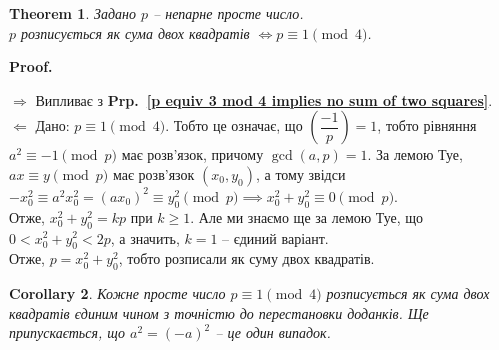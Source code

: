 \documentclass[a4paper, 10pt]{article}
\makeatletter
\theoremstyle{theoremdd}
\newtheorem{theorem}{Theorem}[subsection]
\theoremstyle{theoremdd}
\theoremstyle{theoremdd}
\theoremstyle{theoremdd}
\theoremstyle{theoremdd}
\theoremstyle{theoremdd}
\theoremstyle{theoremdd}
\theoremstyle{theoremdd}
\newtheorem{corollary}[theorem]{Corollary}
\def\rightproof{$\boxed{\Rightarrow}$ }
\def\leftproof{$\boxed{\Leftarrow}$ }
\renewenvironment{proof}[1][Proof.\\]{\par
\pushQED{\hfill \qed}%
\normalfont \topsep6\p@\@plus6\p@\relax
\trivlist
\item\relax
{\bfseries
#1\@addpunct{.}}\hspace\labelsep\ignorespaces
}{%
\popQED\endtrivlist\@endpefalse
}
\newcommand\prpref[1]{\textbf{Prp.~\ref{#1}}}
\makeatother
\begin{document}
\begin{theorem}
Задано $p$ -- непарне просте число.\\
$p$ розписується як сума двох квадратів $\iff p \equiv 1 \pmod 4$.
\end{theorem}

\begin{proof}
\rightproof Випливає з \prpref{p equiv 3 mod 4 implies no sum of two squares}.
\bigskip \\
\leftproof Дано: $p \equiv 1 \pmod 4$. Тобто це означає, що $\left( \dfrac{-1}{p} \right) = 1$, тобто рівняння $a^2 \equiv -1 \pmod p$ має розв'язок, причому $\gcd(a,p) = 1$. За лемою Туе, $ax \equiv y \pmod p$ має розв'язок $(x_0,y_0)$, а тому звідси\\
$-x_0^2 \equiv a^2x_0^2 = (ax_0)^2 \equiv y_0^2 \pmod p \implies x_0^2 + y_0^2 \equiv 0 \pmod p$.\\
Отже, $x_0^2 + y_0^2 = kp$ при $k \geq 1$. Але ми знаємо ще за лемою Туе, що $0 < x_0^2+y_0^2 < 2p$, а значить, $k = 1$ -- єдиний варіант.\\
Отже, $p = x_0^2+y_0^2$, тобто розписали як суму двох квадратів.
\end{proof}

\begin{corollary}
Кожне просте число $p \equiv 1 \pmod 4$ розписується як сума двох квадратів єдиним чином з точністю до перестановки доданків. Ще припускається, що $a^2 = (-a)^2$ -- це один випадок.
\end{corollary}
\end{document}
